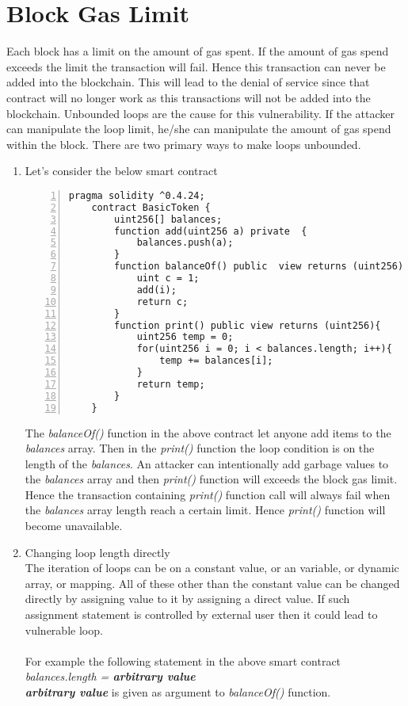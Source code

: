\section{Block Gas Limit}
Each block has a limit on the amount of gas spent. If the amount of gas spend exceeds the limit the transaction will fail. Hence this transaction can never be added into the blockchain. This will lead to the denial of service since that contract will no longer work as this transactions will not be added into the blockchain. Unbounded loops are the cause for this vulnerability. If the attacker can manipulate the loop limit, he/she can manipulate the amount of gas spend within the block. There are two primary ways to make loops unbounded.
\begin{enumerate}
    \item Let's consider the below smart contract
    \begin{Verbatim}[numbers=left,xleftmargin=5mm]
    pragma solidity ^0.4.24;
    contract BasicToken {
        uint256[] balances;
        function add(uint256 a) private  {
            balances.push(a);
        }
        function balanceOf() public  view returns (uint256) {
            uint c = 1;
            add(i);
            return c;
        }
        function print() public view returns (uint256){
            uint256 temp = 0;
            for(uint256 i = 0; i < balances.length; i++){
                temp += balances[i];
            }
            return temp;
        }
    }
    \end{Verbatim}
    
    The \emph{balanceOf()} function in the above contract let anyone add items to the \emph{balances} array. Then in the \emph{print()} function the loop condition is on the length of the \emph{balances}. An attacker can intentionally add garbage values to the \emph{balances} array and then \emph{print()} function will exceeds the block gas limit. Hence the transaction containing \emph{print()} function call will always fail when the \emph{balances} array length reach a certain limit. Hence \emph{print()} function will become unavailable. 
    \item Changing loop length directly\\
    The iteration of loops can be on a constant value, or an variable, or dynamic array, or mapping. All of these other than the constant value can be changed directly by assigning value to it by assigning a direct value. If such assignment statement is controlled by external user then it could lead to vulnerable loop.\\
    \\
    For example the following statement in the above smart contract\\
    \emph{balances.length = \textbf{arbitrary value}}\\
    \emph{\textbf{arbitrary value}} is given as argument to \emph{balanceOf()} function.\\
    
    
\end{enumerate}
